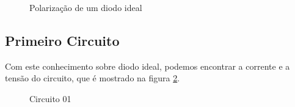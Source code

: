 \begin{figure}[H]
    \centering
    \caption{Polarização de um diodo ideal}
    \vspace{-0.3cm}
    \label{fig:diodo_ideal}
\end{figure}

\subsection{Primeiro Circuito}

Com este conhecimento sobre diodo ideal, podemos encontrar a corrente e a tensão do circuito, que é mostrado na figura \ref{fig:ex_diodo_ideal_01}.

\begin{figure}[H]
    \centering
    \caption{Circuito 01}
    \vspace{-0.3cm}
    \label{fig:ex_diodo_ideal_01}
\end{figure}

